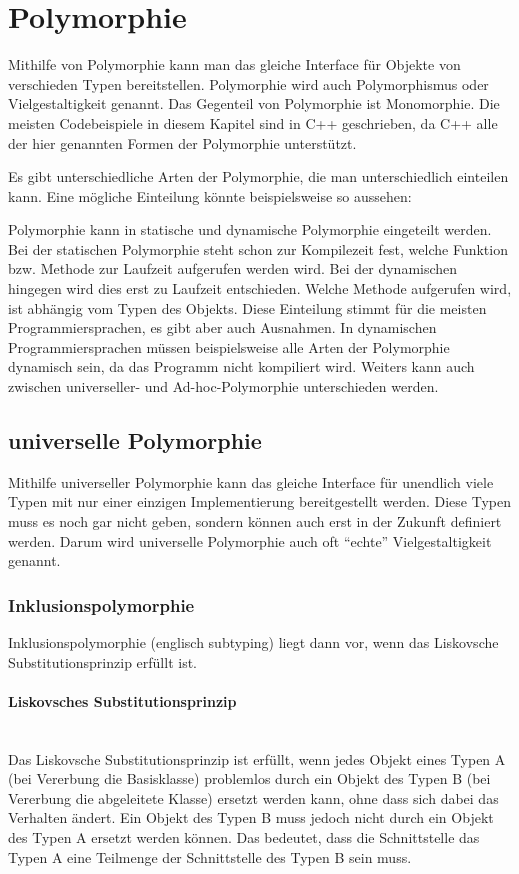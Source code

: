 \section{Polymorphie}
	Mithilfe von Polymorphie kann man das gleiche Interface für Objekte von verschieden Typen bereitstellen. Polymorphie wird
	auch Polymorphismus oder Vielgestaltigkeit genannt. Das Gegenteil von Polymorphie ist Monomorphie. Die meisten Codebeispiele
	in diesem Kapitel sind in C++ geschrieben, da C++ alle der hier genannten Formen der Polymorphie unterstützt.
	
	Es gibt unterschiedliche Arten der Polymorphie, die man unterschiedlich einteilen kann. Eine mögliche Einteilung könnte
	beispielsweise so aussehen:
	
	
	
	Polymorphie kann in statische und dynamische Polymorphie eingeteilt werden. Bei der statischen Polymorphie steht schon
	zur Kompilezeit fest, welche Funktion bzw. Methode zur Laufzeit aufgerufen werden wird. Bei der dynamischen hingegen
	wird dies erst zu Laufzeit entschieden. Welche Methode aufgerufen wird, ist abhängig vom Typen des Objekts.
	Diese Einteilung stimmt für die meisten Programmiersprachen, es gibt aber auch Ausnahmen. In dynamischen
	Programmiersprachen müssen beispielsweise alle Arten der Polymorphie dynamisch sein, da das Programm nicht kompiliert
	wird.
	Weiters kann auch zwischen universeller- und Ad-hoc-Polymorphie unterschieden werden.

	\subsection{universelle Polymorphie}
		Mithilfe universeller Polymorphie kann das gleiche Interface für unendlich viele Typen mit nur einer einzigen Implementierung bereitgestellt werden. Diese
		Typen muss es noch gar nicht geben, sondern können auch erst in der Zukunft definiert werden. Darum wird
		universelle Polymorphie auch oft ``echte'' Vielgestaltigkeit genannt.
		
		\subsubsection{Inklusionspolymorphie}
			Inklusionspolymorphie (englisch subtyping) liegt dann vor, wenn das Liskovsche Substitutionsprinzip erfüllt ist.
			
			\paragraph{Liskovsches Substitutionsprinzip}\mbox{}\\
				Das Liskovsche Substitutionsprinzip ist erfüllt, wenn jedes Objekt eines Typen A (bei Vererbung die
				Basisklasse) problemlos durch ein Objekt des Typen B (bei Vererbung die abgeleitete Klasse) ersetzt werden
				kann, ohne dass sich dabei das Verhalten ändert. Ein Objekt des Typen B muss jedoch nicht durch ein Objekt
				des Typen A ersetzt werden können. Das bedeutet, dass die Schnittstelle das Typen A eine Teilmenge der
				Schnittstelle des Typen B sein muss.
		
